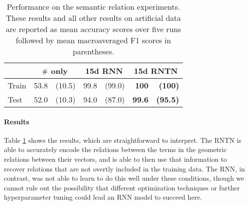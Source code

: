 \begin{table}[tp]
  \centering \small
  \begin{tabular}{ l r@{ \ }r r@{ \ }r r@{ \ }r }
    \toprule
    ~&\multicolumn{2}{c}{$\mathbin{\#}$ only} & \multicolumn{2}{c}{15d RNN}  & \multicolumn{2}{c}{15d RNTN}\\
    \midrule
    Train &53.8 &(10.5)    & 99.8&	(99.0) & \textbf{100} & \textbf{(100)}\\
    Test &52.0 &(10.3) &	94.0&(87.0)& \textbf{99.6} & \textbf{(95.5)}\\
    \bottomrule
  \end{tabular}
  \caption{Performance on the semantic relation experiments. These results and all other results on artificial data are reported as mean accuracy scores over five runs followed by mean macroaveraged F1 scores in parentheses.}
  \label{joinresultstable}
\end{table}

\paragraph{Results} 
Table \ref{joinresultstable} shows the results, which are straightforward 
to interpret. The RNTN is able to accurately encode the relations 
between the terms in the geometric relations between their vectors, 
and is able to then use that information to recover relations that 
are not overtly included in the training data. The RNN, in contrast, was not able to learn
to do this well under these conditions, though we cannot rule
out the possibility that different optimization techniques or further hyperparameter 
tuning could lead an RNN model to succeed here.

